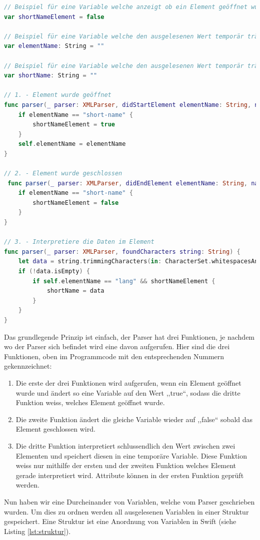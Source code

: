 \documentclass[12pt]{article}
\begin{document}
\begin{lstlisting}[language=Swift,caption={XML-Parser in Swift},label={lst:xmlParser}]
// Beispiel für eine Variable welche anzeigt ob ein Element geöffnet wurde oder nicht.
var shortNameElement = false

// Beispiel für eine Variable welche den ausgelesenen Wert temporär trägt
var elementName: String = ""

// Beispiel für eine Variable welche den ausgelesenen Wert temporär trägt und später in eine Struktur übertragen wird
var shortName: String = ""
  
// 1. - Element wurde geöffnet
func parser(_ parser: XMLParser, didStartElement elementName: String, namespaceURI: String?, qualifiedName qName: String?, attributes attributeDict: [String : String] = [:]) {
    if elementName == "short-name" {
        shortNameElement = true
    }
    self.elementName = elementName
}
    
// 2. - Element wurde geschlossen
 func parser(_ parser: XMLParser, didEndElement elementName: String, namespaceURI: String?, qualifiedName qName: String?) {
    if elementName == "short-name" {
        shortNameElement = false
    }
}
      
// 3. - Interpretiere die Daten im Element
func parser(_ parser: XMLParser, foundCharacters string: String) {
    let data = string.trimmingCharacters(in: CharacterSet.whitespacesAndNewlines)
    if (!data.isEmpty) {
        if self.elementName == "lang" && shortNameElement {
            shortName = data
        } 
    }
}
\end{lstlisting}
Das grundlegende Prinzip ist einfach, der Parser hat drei Funktionen, je nachdem wo der Parser sich befindet wird eine davon aufgerufen. Hier sind die drei Funktionen, oben im Programmcode mit den entsprechenden Nummern gekennzeichnet: 
\begin{enumerate}
\item Die erste der drei Funktionen wird aufgerufen, wenn ein Element geöffnet wurde und ändert so eine Variable auf den Wert ,,true``, sodass die dritte Funktion weiss, welches Element geöffnet wurde. 
\item Die zweite Funktion ändert die gleiche Variable wieder auf ,,false`` sobald das Element geschlossen wird. 
\item Die dritte Funktion interpretiert schlussendlich den Wert zwischen zwei Elementen und speichert diesen  in eine temporäre Variable. Diese Funktion weiss nur mithilfe der ersten und der zweiten Funktion welches Element gerade interpretiert wird. Attribute können in der ersten Funktion geprüft werden. 
\end{enumerate}
Nun haben wir eine Durcheinander von Variablen, welche vom Parser geschrieben wurden. Um dies zu ordnen werden all ausgelesenen Variablen in einer Struktur gespeichert. Eine Struktur ist eine Anordnung von Variablen in Swift (siehe Listing \ref{lst:struktur}).
\end{document}

